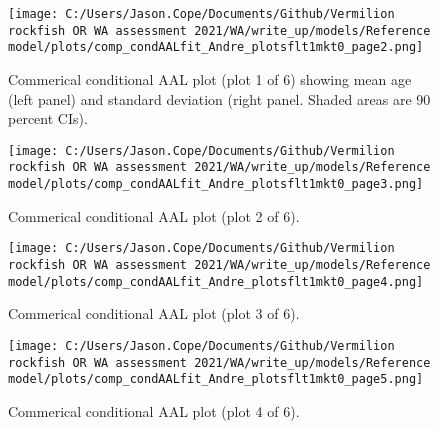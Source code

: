 \documentclass[11pt,
  english,
  a4paper,
]{article}
\begin{document}
\leavevmode\tagmcend\tagstructend


\begin{figure}
\centering
\texttt{[image: C:/Users/Jason.Cope/Documents/Github/Vermilion rockfish OR WA assessment 2021/WA/write\_up/models/Reference model/plots/comp\_condAALfit\_Andre\_plotsflt1mkt0\_page2.png]}
\caption{Commerical conditional AAL plot (plot 1 of 6) showing mean age (left panel) and standard deviation (right panel. Shaded areas are 90 percent CIs).\label{fig:comp_condAALfit_Andre_plotsflt1mkt0_page2}}
\end{figure}

\tagmcend\tagstructend


\begin{figure}
\centering
\texttt{[image: C:/Users/Jason.Cope/Documents/Github/Vermilion rockfish OR WA assessment 2021/WA/write\_up/models/Reference model/plots/comp\_condAALfit\_Andre\_plotsflt1mkt0\_page3.png]}
\caption{Commerical conditional AAL plot (plot 2 of 6).\label{fig:comp_condAALfit_Andre_plotsflt1mkt0_page3}}
\end{figure}

\tagmcend\tagstructend


\begin{figure}
\centering
\texttt{[image: C:/Users/Jason.Cope/Documents/Github/Vermilion rockfish OR WA assessment 2021/WA/write\_up/models/Reference model/plots/comp\_condAALfit\_Andre\_plotsflt1mkt0\_page4.png]}
\caption{Commerical conditional AAL plot (plot 3 of 6).\label{fig:comp_condAALfit_Andre_plotsflt1mkt0_page4}}
\end{figure}

\tagmcend\tagstructend


\begin{figure}
\centering
\texttt{[image: C:/Users/Jason.Cope/Documents/Github/Vermilion rockfish OR WA assessment 2021/WA/write\_up/models/Reference model/plots/comp\_condAALfit\_Andre\_plotsflt1mkt0\_page5.png]}
\caption{Commerical conditional AAL plot (plot 4 of 6).\label{fig:comp_condAALfit_Andre_plotsflt1mkt0_page5}}
\end{figure}
\end{document}
